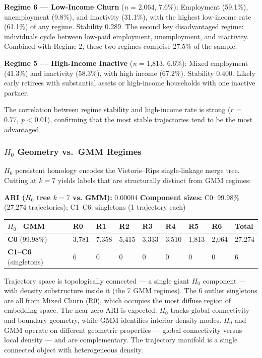 \textbf{Regime 6 --- Low-Income Churn} (\textit{n} = 2,064, 7.6\%): Employment (59.1\%), unemployment (9.8\%), and inactivity (31.1\%), with the highest low-income rate (61.1\%) of any regime. Stability 0.289. The second key disadvantaged regime: individuals cycle between low-paid employment, unemployment, and inactivity. Combined with Regime 2, these two regimes comprise 27.5\% of the sample.

\textbf{Regime 5 --- High-Income Inactive} (\textit{n} = 1,813, 6.6\%): Mixed employment (41.3\%) and inactivity (58.3\%), with high income (67.2\%). Stability 0.400. Likely early retirees with substantial assets or high-income households with one inactive partner.

The correlation between regime stability and high-income rate is strong ($r$ = 0.77, \textit{p} < 0.01), confirming that the most stable trajectories tend to be the most advantaged.

\subsubsection{$H_0$ Geometry vs.\ GMM Regimes}
\label{sec:h0-gmm}

$H_0$ persistent homology encodes the Vietoris--Rips single-linkage merge tree. Cutting at $k = 7$ yields labels that are structurally distinct from GMM regimes:

\textbf{ARI ($H_0$ tree $k = 7$ vs. GMM):} 0.00004
\textbf{Component sizes:} C0: 99.98\% (27,274 trajectories); C1--C6: singletons (1 trajectory each)

\begin{tabular}{lllllllll}
\toprule
$H_0$ \ GMM & R0 & R1 & R2 & R3 & R4 & R5 & R6 & Total \\
\midrule
\textbf{C0} (99.98\%) & 3,781 & 7,358 & 5,415 & 3,333 & 3,510 & 1,813 & 2,064 & 27,274 \\
\textbf{C1--C6} (singletons) & 6 & 0 & 0 & 0 & 0 & 0 & 0 & 6 \\
\bottomrule
\end{tabular}

Trajectory space is topologically connected --- a single giant $H_0$ component --- with density substructure inside it (the 7 GMM regimes). The 6 outlier singletons are all from Mixed Churn (R0), which occupies the most diffuse region of embedding space. The near-zero ARI is expected: $H_0$ tracks global connectivity and boundary geometry, while GMM identifies interior density modes. $H_0$ and GMM operate on different geometric properties --- global connectivity versus local density --- and are complementary. The trajectory manifold is a single connected object with heterogeneous density.

